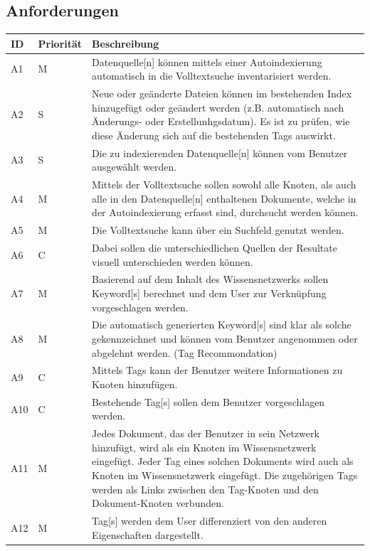 \subsection{Anforderungen}
\begin{longtable}{|p{1.5cm} | p{1.5cm} | p{8.1cm}|}
  \hline
    ID & Priorität & Beschreibung \\\hline
    A1 & M & \gls{Datenquelle}[n] können mittels einer Autoindexierung automatisch in die Volltextsuche inventarisiert werden.\\\hline
    A2 & S & Neue oder geänderte Dateien können im bestehenden Index hinzugefügt oder geändert werden (z.B. automatisch nach Änderungs- oder Erstellunhgsdatum). Es ist zu prüfen, wie diese Änderung sich auf die bestehenden Tags auswirkt. \\\hline
    A3 & S  & Die zu indexierenden \gls{Datenquelle}[n] können vom Benutzer ausgewählt werden.\\\hline
    A4 & M & Mittels der Volltextsuche sollen sowohl alle Knoten, als auch alle in den \gls{Datenquelle}[n] enthaltenen Dokumente, welche in der Autoindexierung erfasst sind, durchsucht werden können.\\\hline
    A5 & M & Die Volltextsuche kann über ein Suchfeld genutzt werden.\\\hline
    A6 & C & Dabei sollen die unterschiedlichen Quellen der Resultate visuell unterschieden werden können.\\\hline
    A7 & M & Basierend auf dem Inhalt des Wissensnetzwerks sollen \gls{Keyword}[s] berechnet und dem User zur Verknüpfung vorgeschlagen werden.\\\hline
    A8 & M & Die automatisch generierten \gls{Keyword}[s] sind klar als solche gekennzeichnet und können vom Benutzer angenommen oder abgelehnt werden. (\gls{Tag Recommondation})\\\hline
    A9 & C & Mittels \gls{Tags} kann der Benutzer weitere Informationen zu Knoten hinzufügen.\\\hline
    A10 & C & Bestehende \gls{Tag}[s] sollen dem Benutzer vorgeschlagen werden.\\\hline
    A11 & M & Jedes Dokument, das der Benutzer in sein Netzwerk hinzufügt, wird als ein Knoten im Wissensnetzwerk eingefügt. Jeder \gls{Tag} eines solchen Dokuments wird auch als Knoten im Wissensnetzwerk eingefügt. Die zugehörigen Tags werden als  Links zwischen den Tag-Knoten und den Dokument-Knoten verbunden.\\\hline
    A12 & M & \gls{Tag}[s] werden dem User differenziert von den anderen Eigenschaften dargestellt.\\\hline

\end{longtable}
